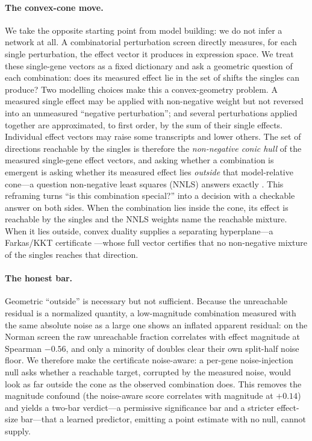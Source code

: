 \paragraph{The convex-cone move.}
We take the opposite starting point from model building: we do not infer a network at all. A
combinatorial perturbation screen directly measures, for each single perturbation, the effect
vector it produces in expression space. We treat these single-gene vectors as a fixed dictionary
and ask a geometric question of each combination: does its measured effect lie in the set of
shifts the singles can produce? Two modelling choices make this a convex-geometry problem. A
measured single effect may be applied with non-negative weight but not reversed into an unmeasured
``negative perturbation''; and several perturbations applied together are approximated, to first
order, by the sum of their single effects. Individual effect vectors may raise some transcripts
and lower others. The set of directions reachable by the singles is therefore the
\emph{non-negative conic hull} of the measured single-gene effect vectors, and asking whether a
combination is emergent is asking whether its measured effect lies \emph{outside} that
model-relative cone---a question non-negative least squares (NNLS) answers exactly
\citep{LawsonHanson1974}. This reframing turns ``is this combination special?'' into a decision
with a checkable answer on both sides. When the combination lies inside the cone, its effect is
reachable by the singles and the NNLS weights name the reachable mixture. When it lies outside,
convex duality supplies a separating hyperplane---a Farkas/KKT certificate
\citep{Farkas1902,KuhnTucker1951}---whose full vector certifies that no non-negative mixture of
the singles reaches that direction.

\paragraph{The honest bar.}
Geometric ``outside'' is necessary but not sufficient. Because the unreachable residual is a
normalized quantity, a low-magnitude combination measured with the same absolute noise as a
large one shows an inflated apparent residual: on the Norman screen the raw unreachable fraction
correlates with effect magnitude at Spearman $-0.56$, and only a minority of doubles clear their
own split-half noise floor. We therefore make the certificate noise-aware: a per-gene
noise-injection null asks whether a reachable target, corrupted by the measured noise, would look
as far outside the cone as the observed combination does. This removes the magnitude confound
(the noise-aware score correlates with magnitude at $+0.14$) and yields a two-bar verdict---a
permissive significance bar and a stricter effect-size bar---that a learned predictor, emitting a
point estimate with no null, cannot supply.

